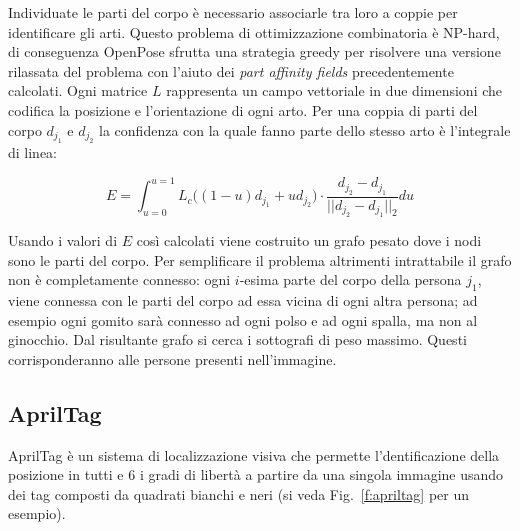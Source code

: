\documentclass[10pt,twocolumn]{article}
\newcommand{\Fig}[1]{Fig.~\ref{#1}}
\begin{document}
  Individuate le parti del corpo è necessario associarle tra loro a coppie per
  identificare gli arti. Questo problema di ottimizzazione combinatoria è
  NP-hard, di conseguenza OpenPose sfrutta una strategia greedy per risolvere
  una versione rilassata del problema con l'aiuto dei \textit{part affinity
  fields} precedentemente calcolati. Ogni matrice $L$ rappresenta un campo
  vettoriale in due dimensioni che codifica la posizione e l'orientazione di
  ogni arto. Per una coppia di parti del corpo $d_{j_1}$ e $d_{j_2}$
  la confidenza con la quale fanno parte dello stesso arto è l'integrale di
  linea:
  
  \newcommand{\vardist}{d_{j_2} - d_{j_1}}
  \newcommand{\varinterpol}{(1 - u)d_{j_1} + ud_{j_2}}
  \begin{equation}
    E = \int_{u=0}^{u=1} L_c\big(\varinterpol\big) \cdot \frac{\vardist}{||\vardist||_2} du
  \end{equation}
  
  Usando i valori di $E$ così calcolati viene costruito un grafo pesato dove i
  nodi sono le parti del corpo. Per semplificare il problema altrimenti
  intrattabile il grafo non è completamente connesso: ogni $i$-esima parte del
  corpo della persona $j_1$, viene connessa con le parti del corpo ad essa
  vicina di ogni altra persona; ad esempio ogni gomito sarà connesso ad ogni
  polso e ad ogni spalla, ma non al ginocchio. Dal risultante grafo si cerca i
  sottografi di peso massimo. Questi corrisponderanno alle persone presenti
  nell'immagine.

  \subsection{AprilTag}
  AprilTag \cite{olson2011tags} è un sistema di localizzazione visiva che
  permette l'dentificazione della posizione in tutti e 6 i gradi di libertà a
  partire da una singola immagine usando dei tag composti da quadrati bianchi e
  neri (si veda \Fig{f:apriltag} per un esempio). 
  
\end{document}
